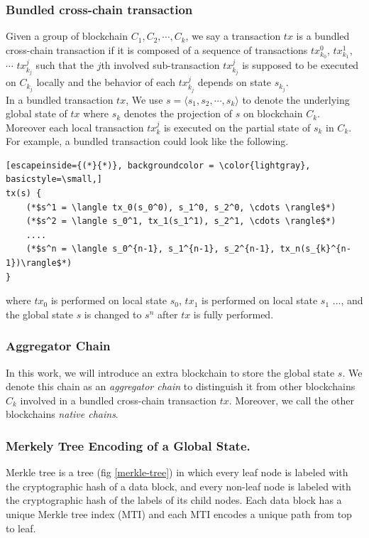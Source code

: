 \documentclass[pageno]{jpaper}
\begin{document}
\subsubsection{Bundled cross-chain transaction}
Given a group of blockchain $C_{1}, C_{2}, \cdots, C_{k}$, we say a transaction $tx$ is a bundled cross-chain transaction if it is composed of a sequence of transactions $tx_{k_0}^0$, $tx_{k_1}^1$, $\cdots$ $tx_{k_j}^j$ such that the $j$th involved sub-transaction $tx_{k_j}^j$ is supposed to be executed on $C_{k_j}$ locally and the behavior of each $tx_{k_j}^{j}$ depends on state $s_{k_j}$. \\
\newline
In a bundled transaction $tx$, We use $s= \langle s_1, s_2, \cdots, s_k \rangle$ to denote the underlying global state of $tx$ where $s_k$ denotes the projection of $s$ on blockchain $C_k$. Moreover each local transaction $tx_k^j$ is executed on the partial state of $s_k$ in $C_k$. For example, a bundled transaction could look like the following. 
\begin{lstlisting}[escapeinside={(*}{*)}, backgroundcolor = \color{lightgray}, basicstyle=\small,]
tx(s) {
    (*$s^1 = \langle tx_0(s_0^0), s_1^0, s_2^0, \cdots \rangle$*)
    (*$s^2 = \langle s_0^1, tx_1(s_1^1), s_2^1, \cdots \rangle$*)
    ....
    (*$s^n = \langle s_0^{n-1}, s_1^{n-1}, s_2^{n-1}, tx_n(s_{k}^{n-1})\rangle$*)
}
\end{lstlisting}
where $tx_0$ is performed on local state $s_0$, $tx_1$ is performed on local state $s_1$ ..., and the global state $s$ is changed to $s^n$ after $tx$ is fully performed.
\\
\subsubsection{Aggregator Chain}
In this work, we will introduce an extra blockchain to store the global state $s$. We denote this chain as an \emph{aggregator chain} to distinguish it from other blockchains $C_{k}$ involved in a bundled cross-chain transaction $tx$. Moreover, we call the other blockchains \emph{native chains}.
\\
\subsubsection{Merkely Tree Encoding of a Global State.}
Merkle tree \cite{becker2008merkle} is a tree (fig \ref{merkle-tree}) in which every leaf node is labeled with the cryptographic hash of a data block, and every non-leaf node is labeled with the cryptographic hash of the labels of its child nodes. Each data block has a unique Merkle tree index (MTI) and each MTI encodes a unique path from top to leaf.\\
\end{document}
